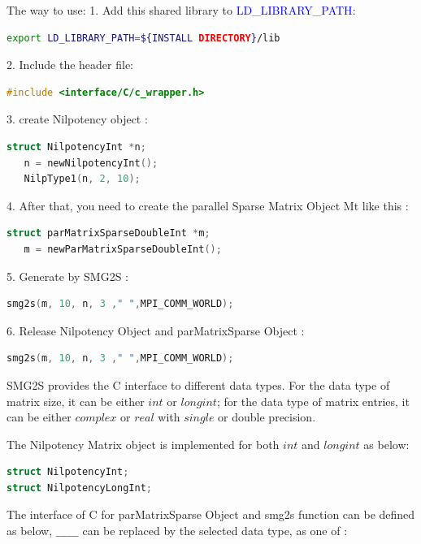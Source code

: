 \documentclass[a4paper, 10 pt]{report}
\begin{document}
	The way to use:
	1. Add this shared library to \textcolor{blue}{LD\_LIBRARY\_PATH}:
	
	\begin{lstlisting}[language=bash,frame=single]
   export LD_LIBRARY_PATH=${INSTALL DIRECTORY}/lib
	\end{lstlisting}

	2. Include the header file:
	\begin{lstlisting}[language=C,frame=single]
  #include <interface/C/c_wrapper.h>
	\end{lstlisting}
	
	3. create Nilpotency object :
	
	\begin{lstlisting}[language=C,frame=single]
   struct NilpotencyInt *n;
   n = newNilpotencyInt();
   NilpType1(n, 2, 10);
	\end{lstlisting}
	
	4. After that, you need to create the parallel Sparse Matrix Object Mt like this :

	\begin{lstlisting}[language=C,frame=single]
   struct parMatrixSparseDoubleInt *m;
   m = newParMatrixSparseDoubleInt();
	\end{lstlisting}

	5. Generate by SMG2S :
	
	\begin{lstlisting}[language=C,frame=single]
   smg2s(m, 10, n, 3 ," ",MPI_COMM_WORLD);
    \end{lstlisting}

   6. Release Nilpotency Object and parMatrixSparse Object :
	\begin{lstlisting}[language=C,frame=single]
   smg2s(m, 10, n, 3 ," ",MPI_COMM_WORLD);
   \end{lstlisting}

	SMG2S provides the C interface to different data types. For the data type of matrix size, it can be either $int$ or $long int$; for the data type of matrix entries, it can be either $complex$ or $real$ with $single$ or double precision.
	
	The  Nilpotency Matrix object is implemented for both $int$ and $long int$ as below:
		\begin{lstlisting}[language=C,frame=single,	basicstyle=\footnotesize]
struct NilpotencyInt;
struct NilpotencyLongInt;
		\end{lstlisting}
	
	The interface of C for parMatrixSparse Object and smg2s function can be defined as below, $\_\_\_\_\_\_$ can be replaced by the selected data type, as one of :
	
\end{document}
